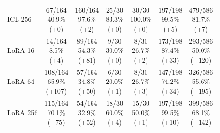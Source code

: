 \begin{table}[htbp]
\begin{tabular}{@{}lcccccc@{}}
ICL 256 & \shortstack{67/164\\[3pt]40.9\%\\[3pt](+0)} & \shortstack{160/164\\[3pt]97.6\%\\[3pt](+2)} & \shortstack{25/30\\[3pt]83.3\%\\[3pt](+0)} & \shortstack{30/30\\[3pt]100.0\%\\[3pt](+0)} & \shortstack{197/198\\[3pt]99.5\%\\[3pt](+5)} & \shortstack{479/586\\[3pt]81.7\%\\[3pt](+7)} \\[8pt]
LoRA 16 & \shortstack{14/164\\[3pt]8.5\%\\[3pt](+4)} & \shortstack{89/164\\[3pt]54.3\%\\[3pt](+81)} & \shortstack{9/30\\[3pt]30.0\%\\[3pt](+0)} & \shortstack{8/30\\[3pt]26.7\%\\[3pt](+2)} & \shortstack{173/198\\[3pt]87.4\%\\[3pt](+33)} & \shortstack{293/586\\[3pt]50.0\%\\[3pt](+120)} \\[8pt]
LoRA 64 & \shortstack{108/164\\[3pt]65.9\%\\[3pt](+107)} & \shortstack{57/164\\[3pt]34.8\%\\[3pt](+50)} & \shortstack{6/30\\[3pt]20.0\%\\[3pt](+1)} & \shortstack{8/30\\[3pt]26.7\%\\[3pt](+3)} & \shortstack{147/198\\[3pt]74.2\%\\[3pt](+34)} & \shortstack{326/586\\[3pt]55.6\%\\[3pt](+195)} \\[8pt]
LoRA 256 & \shortstack{115/164\\[3pt]70.1\%\\[3pt](+75)} & \shortstack{54/164\\[3pt]32.9\%\\[3pt](+52)} & \shortstack{18/30\\[3pt]60.0\%\\[3pt](+4)} & \shortstack{15/30\\[3pt]50.0\%\\[3pt](+1)} & \shortstack{197/198\\[3pt]99.5\%\\[3pt](+10)} & \shortstack{399/586\\[3pt]68.1\%\\[3pt](+142)} \\[8pt]

\end{tabular}
\end{table}
